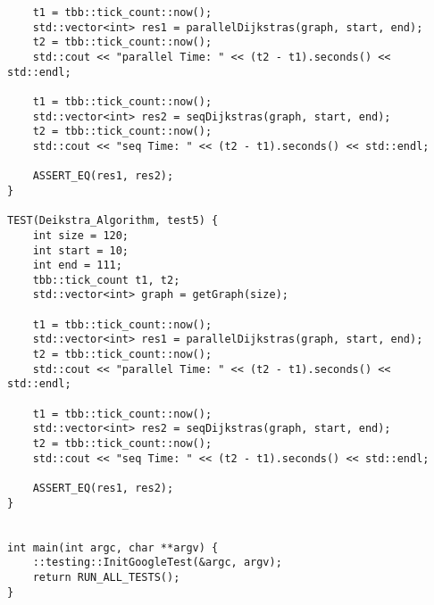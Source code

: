 \documentclass{report}
\begin{document}
\begin{lstlisting}
    t1 = tbb::tick_count::now();
    std::vector<int> res1 = parallelDijkstras(graph, start, end);
    t2 = tbb::tick_count::now();
    std::cout << "parallel Time: " << (t2 - t1).seconds() << std::endl;

    t1 = tbb::tick_count::now();
    std::vector<int> res2 = seqDijkstras(graph, start, end);
    t2 = tbb::tick_count::now();
    std::cout << "seq Time: " << (t2 - t1).seconds() << std::endl;

    ASSERT_EQ(res1, res2);
}

TEST(Deikstra_Algorithm, test5) {
    int size = 120;
    int start = 10;
    int end = 111;
    tbb::tick_count t1, t2;
    std::vector<int> graph = getGraph(size);

    t1 = tbb::tick_count::now();
    std::vector<int> res1 = parallelDijkstras(graph, start, end);
    t2 = tbb::tick_count::now();
    std::cout << "parallel Time: " << (t2 - t1).seconds() << std::endl;

    t1 = tbb::tick_count::now();
    std::vector<int> res2 = seqDijkstras(graph, start, end);
    t2 = tbb::tick_count::now();
    std::cout << "seq Time: " << (t2 - t1).seconds() << std::endl;

    ASSERT_EQ(res1, res2);
}


int main(int argc, char **argv) {
    ::testing::InitGoogleTest(&argc, argv);
    return RUN_ALL_TESTS();
}

\end{lstlisting}
\end{document}
